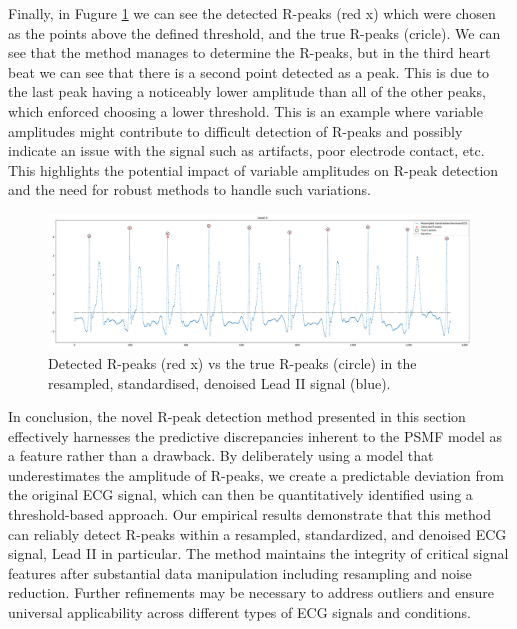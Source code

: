 \documentclass{mldsmsc}
\begin{document}
\noindent Finally, in Fugure \ref{fig:rpeaks-ecg} we can see the detected R-peaks (red x) which were chosen as the points above the defined threshold, and the true R-peaks (cricle). We can see that the method manages to determine the R-peaks, but in the third heart beat we can see that there is a second point detected as a peak. This is due to the last peak having a noticeably lower amplitude than all of the other peaks, which enforced choosing a lower threshold. This is an example where variable amplitudes might contribute to difficult detection of R-peaks and possibly indicate an issue with the signal such as artifacts, poor electrode contact, etc. This highlights the potential impact of variable amplitudes on R-peak detection and the need for robust methods to handle such variations.

\begin{figure}[H]
\centering
\includegraphics[width=1\linewidth]{images/r_peaks/resampled_standardised_denoised_ecg_rpeaks_m.pdf}
\caption{Detected R-peaks (red x) vs the true R-peaks (circle) in the resampled, standardised, denoised Lead II signal (blue).}
\label{fig:rpeaks-ecg}
\end{figure}

\noindent In conclusion, the novel R-peak detection method presented in this section effectively harnesses the predictive discrepancies inherent to the PSMF model as a feature rather than a drawback. By deliberately using a model that underestimates the amplitude of R-peaks, we create a predictable deviation from the original ECG signal, which can then be quantitatively identified using a threshold-based approach. Our empirical results demonstrate that this method can reliably detect R-peaks within a resampled, standardized, and denoised ECG signal, Lead II in particular. The method maintains the integrity of critical signal features after substantial data manipulation including resampling and noise reduction. Further refinements may be necessary to address outliers and ensure universal applicability across different types of ECG signals and conditions.
\end{document}
